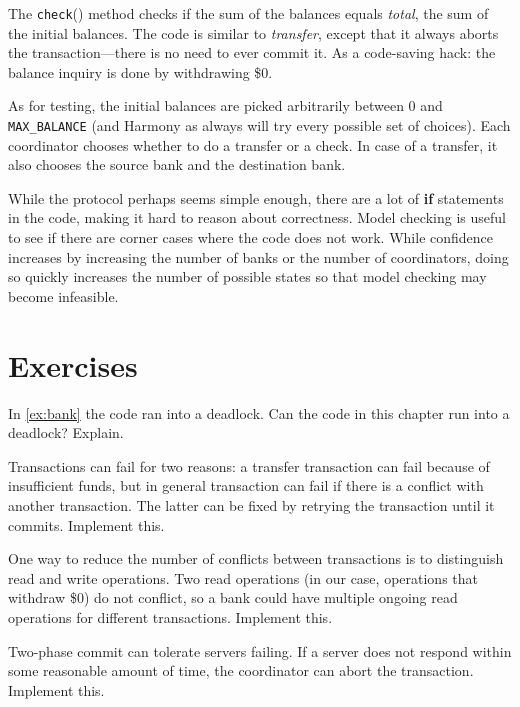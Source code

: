 \documentclass{report}
\begin{document}
{

The \texttt{check}() method checks if the sum of the balances equals
\textit{total}, the sum of the initial balances.
The code is similar to \textit{transfer}, except that it always
aborts the transaction---there is no need to ever commit it.
As a code-saving hack: the balance inquiry is done by withdrawing \$0.

As for testing, the initial balances are picked arbitrarily between
0 and \texttt{MAX\_BALANCE} (and Harmony as always will try every
possible set of choices).
Each coordinator chooses whether to do a transfer or a check.  In
case of a transfer, it also chooses the source bank and the destination
bank.

While the protocol perhaps seems simple enough, there are a lot of
\textbf{if} statements in the code, making it hard to reason about
correctness.
Model checking is useful to see if there are corner
cases where the code does not work.
While confidence increases by
increasing the number of banks or the number of coordinators, doing so
quickly increases the number of possible states so that model checking
may become infeasible.

\section*{Exercises}
\begin{problems}
\item In \autoref{ex:bank} the code ran into a deadlock.  Can the code
in this chapter run into a deadlock?  Explain.
\item Transactions can fail for two reasons: a transfer transaction can
fail because of insufficient funds, but in general transaction can fail
if there is a conflict with another transaction.  The latter can be
fixed by retrying the transaction until it commits.  Implement this.
\item One way to reduce the number of conflicts between transactions
is to distinguish read and write operations.  Two read operations
(in our case, operations that withdraw \$0) do not conflict,
so a bank could have multiple ongoing read operations
for different transactions.  Implement this.
\item Two-phase commit can tolerate servers failing.  If a server does not
respond within some reasonable amount of time, the coordinator can abort
the transaction.  Implement this.
\end{problems}

}
\end{document}
